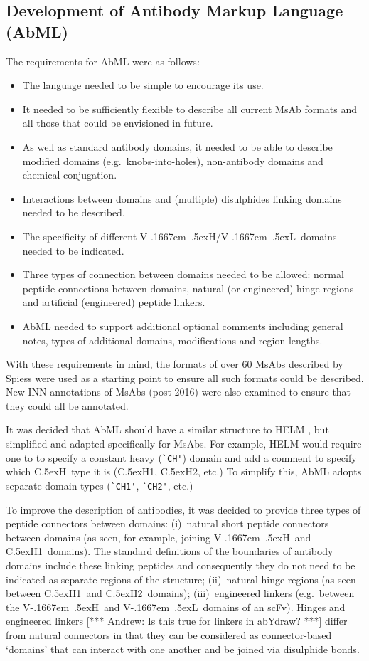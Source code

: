 \documentclass[a4]{article}
\newcommand{\VH}{\mbox{V\kern-.1667em \lower.5ex\hbox{\scriptsize H}}}
\newcommand{\VL}{\mbox{V\kern-.1667em \lower.5ex\hbox{\scriptsize L}}}
\newcommand{\VHVL}{\mbox{\VH/\VL}}
\newcommand{\CH}[1]{\mbox{C\lower.5ex\hbox{\scriptsize H}#1}}
\newcommand{\andrew}[1]{{\color{red} [*** Andrew: #1 ***]}}
\let\shortcite\cite
\begin{document}
\subsection{Development of Antibody Markup Language (AbML)}
The requirements for AbML were as follows:
\begin{itemize}
\item The language needed to be simple to encourage its use.
\item It needed to be sufficiently flexible to describe all current
  MsAb formats and all those that could be envisioned in future.
\item As well as standard antibody domains, it needed to be able to
  describe modified domains (e.g.\ knobs-into-holes), non-antibody
  domains and chemical conjugation.
\item Interactions between domains and (multiple) disulphides linking
  domains needed to be described.
\item The specificity of different \VHVL\ domains needed to be
  indicated.
\item Three types of connection between domains needed to be allowed:
  normal peptide connections between domains, natural (or engineered)
  hinge regions and artificial (engineered) peptide linkers.
\item AbML needed to support additional optional comments including
  general notes, types of additional domains, modifications and region
  lengths.
\end{itemize}
  
With these requirements in mind, the formats of over 60 MsAbs
described by Spiess \shortcite{spiess:2015} were used as a starting
point to ensure all such formats could be described. New INN
annotations of MsAbs (post 2016) were also examined to ensure that
they could all be annotated.

It was decided that AbML should have a similar structure to HELM
\cite{zhang:2012}, but simplified and adapted specifically for MsAbs.
For example, HELM would require one to
to specify a constant heavy (\verb|`CH'|) domain and add a
comment to specify which \CH\ type it is (\CH{1}, \CH{2}, etc.)
To simplify this, AbML adopts separate domain types (\verb|`CH1'|,
\verb|`CH2'|, etc.)

To improve the description of antibodies, it was decided to provide
three types of peptide connectors between domains: (i)~natural short
peptide connectors between domains (as seen, for example, joining \VH\
and \CH1\ domains). The standard definitions of the boundaries of
antibody domains include these linking peptides and consequently they
do not need to be indicated as separate regions of the structure;
(ii)~natural hinge regions (as seen between \CH1\ and \CH2\ domains);
(iii)~engineered linkers (e.g.\ between the \VH\ and \VL\ domains of
an scFv). Hinges and engineered linkers \andrew{Is this true for
  linkers in abYdraw?} differ from natural connectors in that they can
be considered as connector-based `domains' that can interact with one
another and be joined via disulphide bonds.
\end{document}
